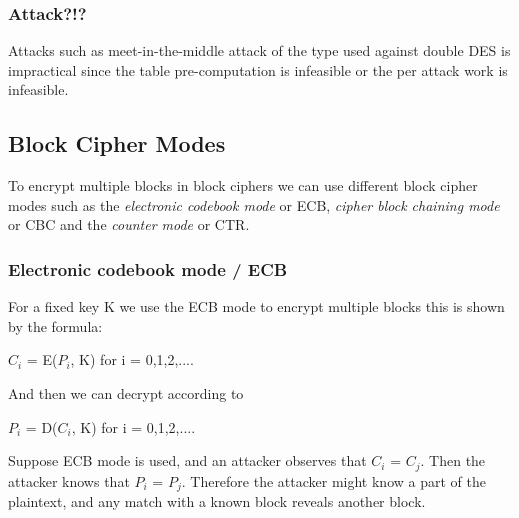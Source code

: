 \documentclass{article}
\begin{document}
\subsubsection{Attack?!?}
Attacks such as meet-in-the-middle attack of the type used against double DES is impractical since the table pre-computation is infeasible or the per attack work is infeasible.

\subsection{Block Cipher Modes}
To encrypt multiple blocks in block ciphers we can use different block cipher modes such as the \textit{electronic codebook mode} or ECB, \textit{cipher block chaining mode} or CBC and the \textit{counter mode} or CTR.

\subsubsection{Electronic codebook mode / ECB}
For a fixed key K we use the ECB mode to encrypt multiple blocks this is shown by the formula:
\begin{center}
    $C_i$ = E($P_i$, K) for i = 0,1,2,....
\end{center}{}
And then we can decrypt according to
\begin{center}
    $P_i$ = D($C_i$, K) for i = 0,1,2,....
\end{center}{}
Suppose ECB mode is used, and an attacker observes that $C_i$ = $C_j$. Then the attacker knows that $P_i$ = $P_j$. Therefore the attacker might know a part of the plaintext, and any match with a known block reveals another block.
\end{document}
